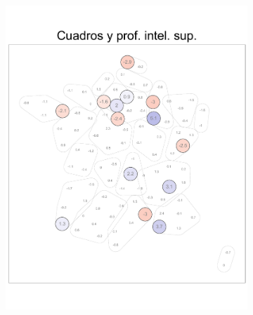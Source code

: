 \begin{figure}
\begin{subfigure}{0.235\textwidth}
	\includegraphics[width = \textwidth]{Figs/Efectos/Dorling_Efectos_CSP3_Modelo_H}
	\end{subfigure}
	~
	\begin{subfigure}{0.235\textwidth}

\end{subfigure}
\end{figure}
